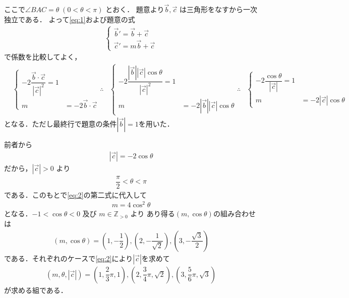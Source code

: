 \documentclass[../../main.tex]{subfiles}
\begin{document}
ここで$\angle BAC = \theta \; (0 < \theta < \pi)$ とおく．
題意より$\vec{b}, \vec{c}$ は三角形をなすから一次独立である．
よって\cref{eq:1}および題意の式
\begin{align}
  \begin{cases}
    \vec{b}' = \vec{b} + \vec{c} \\
    \vec{c}' = m\vec{b} + \vec{c}
  \end{cases}
\end{align}
で係数を比較してよく，
\begin{align}
  &
  \begin{cases}
    -2\dfrac{\vec{b} \cdot \vec{c}}{|\vec{c}|^2} = 1 \\
    m &= -2\vec{b} \cdot \vec{c}
  \end{cases}
  \therefore
  &
  \begin{cases}
    -2 \dfrac{|\vec{b}||\vec{c}|\cos\theta}{|\vec{c}|^2} = 1 \\
    m &= -2|\vec{b}||\vec{c}|\cos\theta
  \end{cases}
  \therefore
  &
  \begin{cases}
    -2 \dfrac{\cos\theta}{|\vec{c}|} = 1 \\
    m &= -2|\vec{c}|\cos\theta
  \end{cases} \label{eq:2}
\end{align}
となる．ただし最終行で題意の条件$|\vec{b}|=1$を用いた．

前者から
\begin{align}
  |\vec{c}| = -2\cos\theta
\end{align}
だから，$|\vec{c}| > 0$ より
\begin{align}
  \dfrac{\pi}{2} < \theta < \pi \label{eq:3}
\end{align}
である．このもとで\cref{eq:2}の第二式に代入して
\begin{align}
  m = 4\cos^2\theta \label{eq:4}
\end{align}
となる．$-1 < \cos\theta < 0$ 及び $m \in \mathbb{Z}_{>0}$ より
あり得る$(m,\cos\theta)$の組み合わせは
\begin{align}
  (m, \cos\theta) = \left(1, -\dfrac{1}{2}\right), \left(2, -\dfrac{1}{\sqrt{2}}\right), \left(3, -\dfrac{\sqrt{3}}{2}\right)
\end{align}
である．それぞれのケースで\cref{eq:2}により$|\vec{c}|$を求めて
\begin{align}
  (m, \theta, |\vec{c}|) = \left(1, \dfrac{2}{3}\pi, 1\right), \left(2, \dfrac{3}{4}\pi, \sqrt{2}\right), \left(3, \dfrac{5}{6}\pi, \sqrt{3}\right)
\end{align}
が求める組である．
\end{document}

